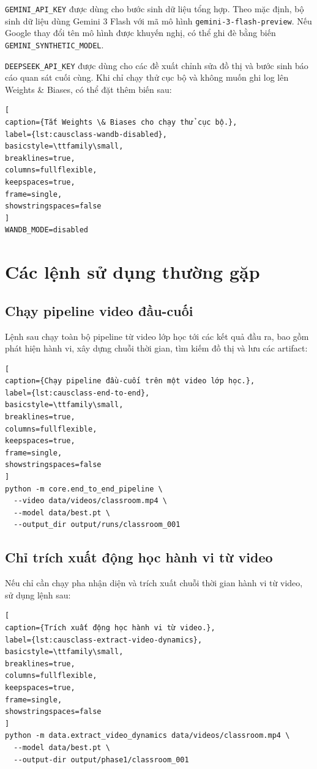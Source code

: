 \texttt{GEMINI\_API\_KEY} được dùng cho bước sinh dữ liệu tổng hợp. Theo mặc định, bộ sinh dữ liệu dùng Gemini 3 Flash với mã mô hình \texttt{gemini-3-flash-preview}. Nếu Google thay đổi tên mô hình được khuyến nghị, có thể ghi đè bằng biến \texttt{GEMINI\_SYNTHETIC\_MODEL}.

\texttt{DEEPSEEK\_API\_KEY} được dùng cho các đề xuất chỉnh sửa đồ thị và bước sinh báo cáo quan sát cuối cùng. Khi chỉ chạy thử cục bộ và không muốn ghi log lên Weights \& Biases, có thể đặt thêm biến sau:

\begin{lstlisting}[
caption={Tắt Weights \& Biases cho chạy thử cục bộ.},
label={lst:causclass-wandb-disabled},
basicstyle=\ttfamily\small,
breaklines=true,
columns=fullflexible,
keepspaces=true,
frame=single,
showstringspaces=false
]
WANDB_MODE=disabled
\end{lstlisting}

\section{Các lệnh sử dụng thường gặp}

\subsection{Chạy pipeline video đầu-cuối}

Lệnh sau chạy toàn bộ pipeline từ video lớp học tới các kết quả đầu ra, bao gồm phát hiện hành vi, xây dựng chuỗi thời gian, tìm kiếm đồ thị và lưu các artifact:

\begin{lstlisting}[
caption={Chạy pipeline đầu-cuối trên một video lớp học.},
label={lst:causclass-end-to-end},
basicstyle=\ttfamily\small,
breaklines=true,
columns=fullflexible,
keepspaces=true,
frame=single,
showstringspaces=false
]
python -m core.end_to_end_pipeline \
  --video data/videos/classroom.mp4 \
  --model data/best.pt \
  --output_dir output/runs/classroom_001
\end{lstlisting}

\subsection{Chỉ trích xuất động học hành vi từ video}

Nếu chỉ cần chạy pha nhận diện và trích xuất chuỗi thời gian hành vi từ video, sử dụng lệnh sau:

\begin{lstlisting}[
caption={Trích xuất động học hành vi từ video.},
label={lst:causclass-extract-video-dynamics},
basicstyle=\ttfamily\small,
breaklines=true,
columns=fullflexible,
keepspaces=true,
frame=single,
showstringspaces=false
]
python -m data.extract_video_dynamics data/videos/classroom.mp4 \
  --model data/best.pt \
  --output-dir output/phase1/classroom_001
\end{lstlisting}

